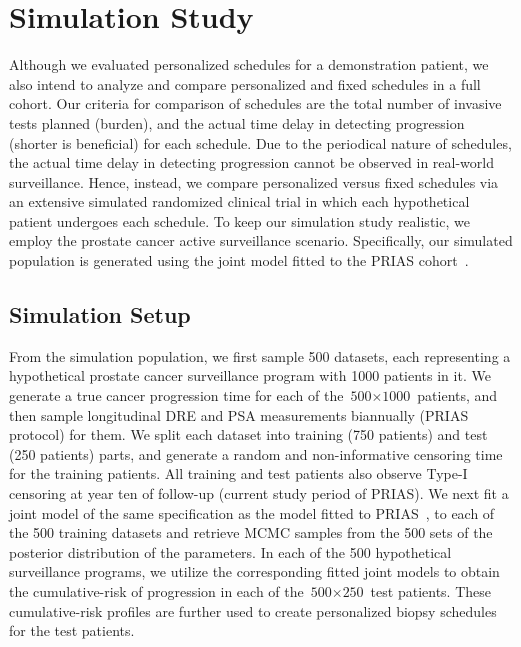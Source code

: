 \section{Simulation Study}
\label{sec:sim_study}
Although we evaluated personalized schedules for a demonstration patient, we also intend to analyze and compare personalized and fixed schedules in a full cohort. Our criteria for comparison of schedules are the total number of invasive tests planned (burden), and the actual time delay in detecting progression (shorter is beneficial) for each schedule. Due to the periodical nature of schedules, the actual time delay in detecting progression cannot be observed in real-world surveillance. Hence, instead, we compare personalized versus fixed schedules via an extensive simulated randomized clinical trial in which each hypothetical patient undergoes each schedule. To keep our simulation study realistic, we employ the prostate cancer active surveillance scenario. Specifically, our simulated population is generated using the joint model fitted to the PRIAS cohort~\citep{tomer2019personalized}.

\subsection{Simulation Setup}
From the simulation population, we first sample 500 datasets, each representing a hypothetical prostate cancer surveillance program with 1000 patients in it. We generate a true cancer progression time for each of the ${\mbox{500} \times \mbox{1000}}$ patients, and then sample longitudinal DRE and PSA measurements biannually (PRIAS protocol) for them. We split each dataset into training (750 patients) and test (250 patients) parts, and generate a random and non-informative censoring time for the training patients. All training and test patients also observe Type-I censoring at year ten of follow-up (current study period of PRIAS). We next fit a joint model of the same specification as the model fitted to PRIAS~\citep{tomer2019personalized}, to each of the 500 training datasets and retrieve MCMC samples from the 500 sets of the posterior distribution of the parameters. In each of the 500 hypothetical surveillance programs, we utilize the corresponding fitted joint models to obtain the cumulative-risk of progression in each of the ${\mbox{500} \times \mbox{250}}$ test patients. These cumulative-risk profiles are further used to create personalized biopsy schedules for the test patients. 

